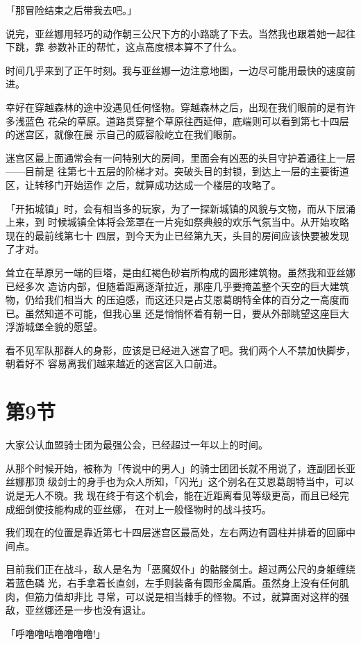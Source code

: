 \documentclass[11pt]{book}
\begin{document}
「那冒险结束之后带我去吧。」

说完，亚丝娜用轻巧的动作朝三公尺下方的小路跳了下去。当然我也跟着她一起往下跳，靠
参数补正的帮忙，这点高度根本算不了什么。

时间几乎来到了正午时刻。我与亚丝娜一边注意地图，一边尽可能用最快的速度前进。

幸好在穿越森林的途中没遇见任何怪物。穿越森林之后，出现在我们眼前的是有许多浅蓝色
花朵的草原。道路贯穿整个草原往西延伸，底端则可以看到第七十四层的迷宫区，就像在展
示自己的威容般屹立在我们眼前。

迷宫区最上面通常会有一问特别大的房间，里面会有凶恶的头目守护着通往上一层——目前是
往第七十五层的阶梯才对。突破头目的封锁，到达上一层的主要街道区，让转移门开始运作
之后，就算成功达成一个楼层的攻略了。

「开拓城镇」时，会有相当多的玩家，为了一探新城镇的风貌与文物，而从下层涌上来，到
时候城镇全体将会笼罩在一片宛如祭典般的欢乐气氛当中。从开始攻略现在的最前线第七十
四层，到今天为止已经第九天，头目的房间应该快要被发现了才对。

耸立在草原另一端的巨塔，是由红褐色砂岩所构成的圆形建筑物。虽然我和亚丝娜已经多次
造访内部，但随着距离逐渐拉近，那座几乎要掩盖整个天空的巨大建筑物，仍给我们相当大
的压迫感，而这还只是占艾恩葛朗特全体的百分之一高度而已。虽然知道不可能，但我心里
还是悄悄怀着有朝一日，要从外部眺望这座巨大浮游城堡全貌的愿望。

看不见军队那群人的身影，应该是已经进入迷宫了吧。我们两个人不禁加快脚步，朝着好不
容易离我们越来越近的迷宫区入口前进。
\section{第9节}
\label{sec:orgadc4fa1}
大家公认血盟骑士团为最强公会，已经超过一年以上的时间。

从那个时候开始，被称为「传说中的男人」的骑士团团长就不用说了，连副团长亚丝娜那顶
级剑士的身手也为众人所知，「闪光」这个别名在艾恩葛朗特当中，可以说是无人不晓。我
现在终于有这个机会，能在近距离看见等级更高，而且已经完成细剑使技能构成的亚丝娜，
在对上一般怪物时的战斗技巧。

我们现在的位置是靠近第七十四层迷宫区最高处，左右两边有圆柱并排着的回廊中间点。

目前我们正在战斗，敌人是名为「恶魔奴仆」的骷髅剑士。超过两公尺的身躯缠绕着蓝色磷
光，右手拿着长直剑，左手则装备有圆形金属盾。虽然身上没有任何肌肉，但筋力值却非比
寻常，可以说是相当棘手的怪物。不过，就算面对这样的强敌，亚丝娜还是一步也没有退让。

「呼噜噜咕噜噜噜噜!」
\end{document}
